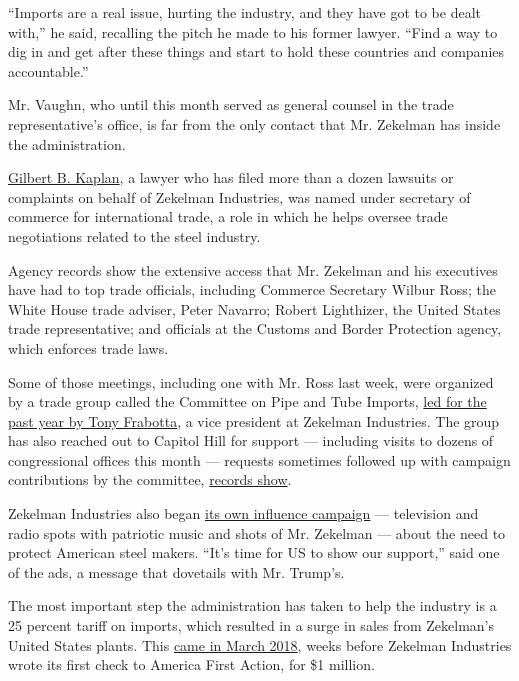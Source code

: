 ``Imports are a real issue, hurting the industry, and they have got to
be dealt with,'' he said, recalling the pitch he made to his former
lawyer. ``Find a way to dig in and get after these things and start to
hold these countries and companies accountable.''

Mr. Vaughn, who until this month served as general counsel in the trade
representative's office, is far from the only contact that Mr. Zekelman
has inside the administration.

\href{https://www.documentcloud.org/documents/4387599-Gilbert-Kaplan-Financial-Disclosure.html}{Gilbert
B. Kaplan}, a lawyer who has filed more than a dozen lawsuits or
complaints on behalf of Zekelman Industries, was named under secretary
of commerce for international trade, a role in which he helps oversee
trade negotiations related to the steel industry.

Agency records show the extensive access that Mr. Zekelman and his
executives have had to top trade officials, including Commerce Secretary
Wilbur Ross; the White House trade adviser, Peter Navarro; Robert
Lighthizer, the United States trade representative; and officials at the
Customs and Border Protection agency, which enforces trade laws.

Some of those meetings, including one with Mr. Ross last week, were
organized by a trade group called the Committee on Pipe and Tube
Imports,
\href{https://www.steel.org/-/media/doc/steel/policy/testimony/steel-caucus-march-2018/032118-steel-caucus-cpti-frabotta-testimony.ashx}{led
for the past year by Tony Frabotta}, a vice president at Zekelman
Industries. The group has also reached out to Capitol Hill for support
--- including visits to dozens of congressional offices this month ---
requests sometimes followed up with campaign contributions by the
committee,
\href{https://www.opensecrets.org/pacs/pacgot.php?cycle=2018\&cmte=C00436485}{records
show}.

Zekelman Industries also began
\href{https://www.chooseamericanmetal.com/}{its own influence campaign}
--- television and radio spots with patriotic music and shots of Mr.
Zekelman --- about the need to protect American steel makers. ``It's
time for US to show our support,'' said one of the ads, a message that
dovetails with Mr. Trump's.

The most important step the administration has taken to help the
industry is a 25 percent tariff on imports, which resulted in a surge in
sales from Zekelman's United States plants. This
\href{https://www.whitehouse.gov/presidential-actions/presidential-proclamation-adjusting-imports-steel-united-states/}{came
in March 2018}, weeks before Zekelman Industries wrote its first check
to America First Action, for \$1 million.

